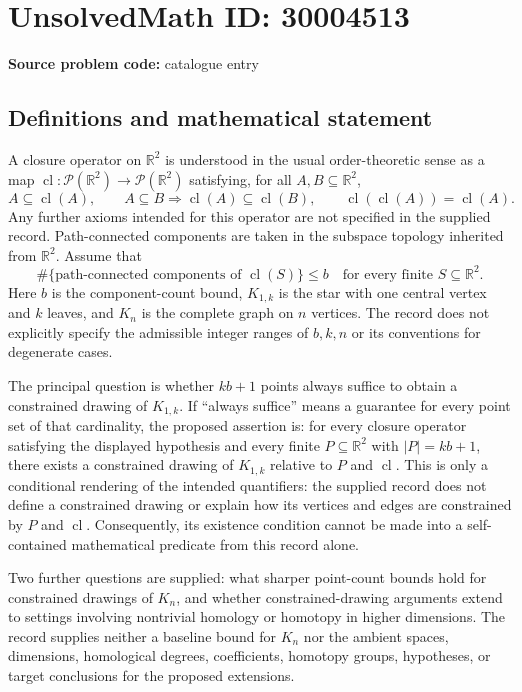 \documentclass[11pt]{article}
\newcommand{\R}{\mathbb{R}}
\begin{document}
\section*{UnsolvedMath ID: 30004513}
\textbf{Source problem code:} catalogue entry
\subsection{Definitions and mathematical statement}
A closure operator on \(\R^2\) is understood in the usual order-theoretic sense as a map \(\operatorname{cl}:\mathcal P(\R^2)\to\mathcal P(\R^2)\) satisfying, for all \(A,B\subseteq\R^2\),
\[
A\subseteq\operatorname{cl}(A),\qquad A\subseteq B\Longrightarrow\operatorname{cl}(A)\subseteq\operatorname{cl}(B),\qquad \operatorname{cl}(\operatorname{cl}(A))=\operatorname{cl}(A).
\]
Any further axioms intended for this operator are not specified in the supplied record. Path-connected components are taken in the subspace topology inherited from \(\R^2\). Assume that
\[
\#\{\text{path-connected components of }\operatorname{cl}(S)\}\le b
\quad\text{for every finite }S\subseteq\R^2.
\]
Here \(b\) is the component-count bound, \(K_{1,k}\) is the star with one central vertex and \(k\) leaves, and \(K_n\) is the complete graph on \(n\) vertices. The record does not explicitly specify the admissible integer ranges of \(b,k,n\) or its conventions for degenerate cases.

The principal question is whether \(kb+1\) points always suffice to obtain a constrained drawing of \(K_{1,k}\). If ``always suffice'' means a guarantee for every point set of that cardinality, the proposed assertion is: for every closure operator satisfying the displayed hypothesis and every finite \(P\subseteq\R^2\) with \(|P|=kb+1\), there exists a constrained drawing of \(K_{1,k}\) relative to \(P\) and \(\operatorname{cl}\). This is only a conditional rendering of the intended quantifiers: the supplied record does not define a constrained drawing or explain how its vertices and edges are constrained by \(P\) and \(\operatorname{cl}\). Consequently, its existence condition cannot be made into a self-contained mathematical predicate from this record alone.

Two further questions are supplied: what sharper point-count bounds hold for constrained drawings of \(K_n\), and whether constrained-drawing arguments extend to settings involving nontrivial homology or homotopy in higher dimensions. The record supplies neither a baseline bound for \(K_n\) nor the ambient spaces, dimensions, homological degrees, coefficients, homotopy groups, hypotheses, or target conclusions for the proposed extensions.
\end{document}
